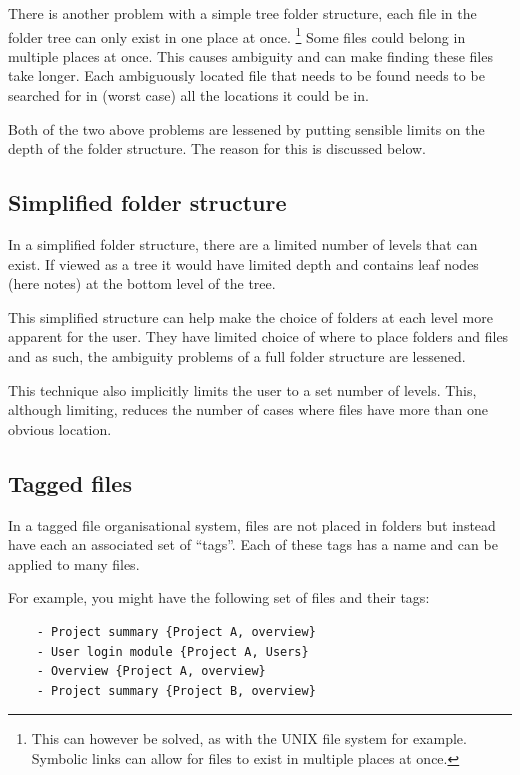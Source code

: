 There is another problem with a simple tree folder structure, each file in the
folder tree can only exist in one place at once.%
%
\footnote{This can however be solved, as with the UNIX file system for example.
Symbolic links can allow for files to exist in multiple places at once. } Some
files could belong in multiple places at once. This causes ambiguity and can
make finding these files take longer. Each ambiguously located file that needs
to be found needs to be searched for in (worst case) all the locations it could
be in.

Both of the two above problems are lessened by putting sensible limits on
the depth of the folder structure. The reason for this is discussed
below.

\subsection{Simplified folder structure}\label{simplified-folder-structure}

In a simplified folder structure, there are a limited number of levels that can
exist. If viewed as a tree it would have limited depth and contains leaf nodes
(here notes) at the bottom level of the tree.

This simplified structure can help make the choice of folders at each
level more apparent for the user. They have limited choice of
where to place folders and files and as such, the ambiguity problems of a
full folder structure are lessened.

This technique also implicitly limits the user to a set number of
levels. This, although limiting, reduces the number of cases where files have
 more than one obvious location.

\subsection{Tagged files}\label{tagged-files}

In a tagged file organisational system, files are not placed in folders
but instead have each an associated set of ``tags''. Each of these tags
has a name and can be applied to many files.

For example, you might have the following set of files and their tags:

\begin{verbatim}
    - Project summary {Project A, overview}
    - User login module {Project A, Users}
    - Overview {Project A, overview}
    - Project summary {Project B, overview}
\end{verbatim}

